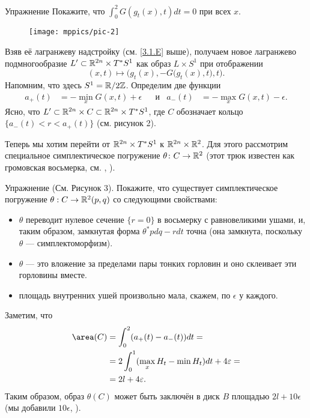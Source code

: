 \begin{ex*}{Упражнение}
Покажите, что $\int_0^2G (g_t (x), t) dt = 0$ при всех $x$.
\end{ex*}

\begin{figure}[ht!]
\vskip-0mm
\centering
\texttt{[image: mppics/pic-2]}
\caption{}\label{pic-2}
\vskip0mm
\end{figure}

Взяв её лагранжеву надстройку (см. \ref{3.1.E} выше),
получаем новое лагранжево подмногообразие $L' \subset \RR^{2n} \z\times T^{\ast} S^1$ как образ $L \times S^1$ при отображении 
\[(x, t) \mapsto \Big(g_t (x), -G \big(g_t (x), t\big), t\Big).\]
Напомним, что здесь $S^1 = \mathbb{R} / 2\mathbb{Z}$.
Определим две функции 
\begin{align*}a_+ (t) &= - \min_x G (x, t) + \epsilon
&&\text{и}&
a_- (t) &= - \max_x G (x, t) - \epsilon.
\end{align*}
Ясно, что $L' \subset \mathbb{R}^{2n} \times C \subset \mathbb{R}^{2n} \times T^\ast S^1$, где $C$ обозначает кольцо 
$\{a_- (t) <r <a_+ (t)\}$
(см. рисунок 2).

Теперь мы хотим перейти от $\mathbb{R}^{2n} \times T^{\ast} S^1$ к $\mathbb{R}^{2n} \times \mathbb{R}^2$.
Для этого рассмотрим специальное симплектическое погружение $\theta\colon C \to \mathbb{R}^2$
(этот трюк известен как громовская восьмерка, см. \cite{G1}, \cite{AL}).

\begin{ex*}{Упражнение}
(См. Рисунок 3).
Покажите, что существует симплектическое погружение $\theta: C \to \mathbb{R}^2 (p, q)$ со следующими свойствами: 
\begin{itemize}
\item $\theta$ переводит нулевое сечение $\{r = 0\}$ в восьмерку с равновеликими ушами, и, таким образом, замкнутая форма $\theta^\ast pdq - rdt$ точна (она замкнута, поскольку $\theta$ --- симплектоморфизм).
\item $\theta$ --- это вложение за пределами пары тонких горловин и оно склеивает эти горловины вместе.
\item площадь внутренних ушей произвольно мала, скажем, по $\epsilon$ у каждого. 
\end{itemize}
\end{ex*}

Заметим, что \?{}{$\area=\Area$}
\begin{align*}
\area (C) 
&= \int_0^2(a_+ (t) - a_- (t)) dt = 
\\
&=2 \int_0^1(\max_x H_t - \min H_t) dt + 4\epsilon =
\\
&=2l + 4\epsilon.
\end{align*}
Таким образом, образ $\theta (C)$ может быть заключён в диск $B$
площадью $2l + 10\epsilon$ (мы добавили $10\epsilon$, ).

